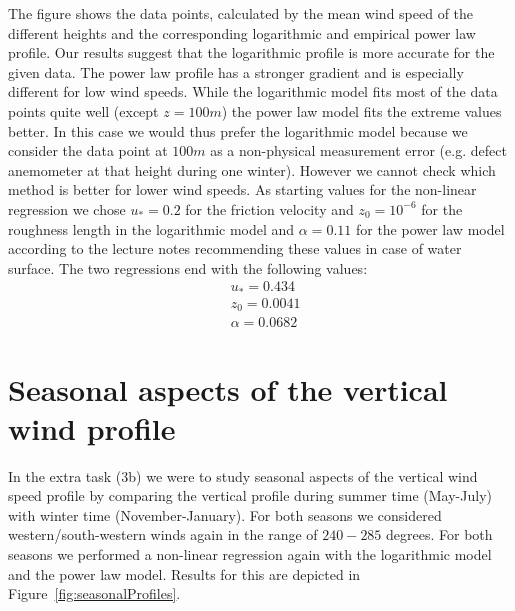 \documentclass[10pt]{article}
\begin{document}
The figure shows the data points, calculated by the mean wind speed of the different heights and the corresponding logarithmic and empirical power law profile.
Our results suggest that the logarithmic profile is more accurate for the given data. The power law profile has a stronger gradient and is especially different for low wind speeds. While the logarithmic model fits most of the data points quite well (except $z=100m$) the power law model fits the extreme values better. In this case we would thus prefer the logarithmic model because we consider the data point at $100m$ as a non-physical measurement error (e.g. defect anemometer at that height during one winter). However we cannot check which method is better for lower wind speeds. As starting values for the non-linear regression we chose $u_{*}=0.2$ for the friction velocity and $z_0 = 10^{-6}$ for the roughness length in the logarithmic model and $\alpha=0.11$ for the power law model according to the lecture notes recommending these values in case of water surface.
The two regressions end with the following values:
\begin{align*}
&u_{*}= 0.434\\
&z_0 = 0.0041\\
&\alpha = 0.0682
\end{align*}
\newpage

\section{Seasonal aspects of the vertical wind profile}
In the extra task (3b) we were to study seasonal aspects of the vertical wind speed profile by comparing the vertical profile during summer time (May-July) with winter time (November-January). For both seasons we considered western/south-western winds again in the range of $240 - 285$ degrees. For both seasons we performed a non-linear regression again with the logarithmic model and the power law model. Results for this are depicted in Figure~\ref{fig:seasonalProfiles}.
\end{document}
